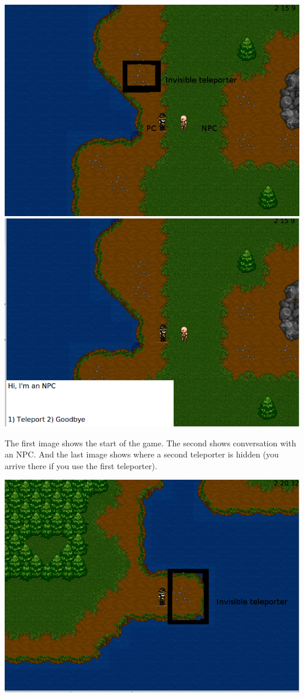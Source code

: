 \documentclass[12pt,a4paper]{article}
\begin{document}
\includegraphics[scale=0.25]{Start}
\includegraphics[scale=0.25]{dialogue_with_npc}

The first image shows the start of the game. The second shows conversation with an NPC. And the last image shows where a second teleporter is hidden (you arrive there if you use the first teleporter).

\includegraphics[scale=0.25]{teleporter2}
\end{document}
